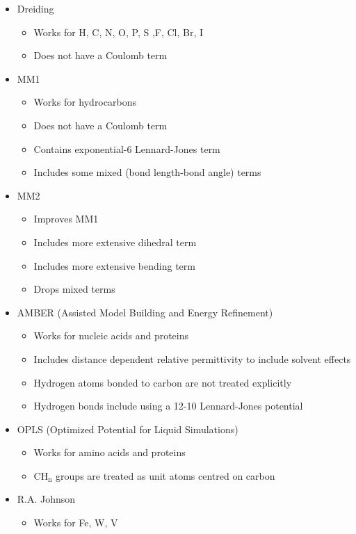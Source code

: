 \documentclass[12pt,a4paper,titlepage]{article}
\newcommand{\trm}[1]{\textrm{#1}} %
\begin{document}
\begin{itemize}[noitemsep]
\item Dreiding
	\begin{itemize}[nolistsep]
	\item Works for H, C, N, O, P, S ,F, Cl, Br, I
	\item Does not have a Coulomb term
	\end{itemize}
\item MM1
	\begin{itemize}[nolistsep]
	\item Works for hydrocarbons
	\item Does not have a Coulomb term
	\item Contains exponential-6 Lennard-Jones term
	\item Includes some mixed (bond length-bond angle) terms
	\end{itemize}
\item MM2
	\begin{itemize}[nolistsep]
	\item Improves MM1
	\item Includes more extensive dihedral term
	\item Includes more extensive bending term
	\item Drops mixed terms
	\end{itemize}
\item AMBER (Assisted Model Building and Energy Refinement)
	\begin{itemize}[nolistsep]
	\item Works for nucleic acids and proteins
	\item Includes distance dependent relative permittivity to include solvent effects
	\item Hydrogen atoms bonded to carbon are not treated explicitly
	\item Hydrogen bonds include using a 12-10 Lennard-Jones potential
	\end{itemize}
\item OPLS (Optimized Potential for Liquid Simulations)
	\begin{itemize}[nolistsep]
	\item Works for amino acids and proteins
	\item CH$_{\trm{n}}$ groups are treated as unit atoms centred on carbon
	\end{itemize}
\item R.A. Johnson
	\begin{itemize}[nolistsep]
	\item Works for Fe, W, V
	\end{itemize}
\end{itemize}
\end{document}

